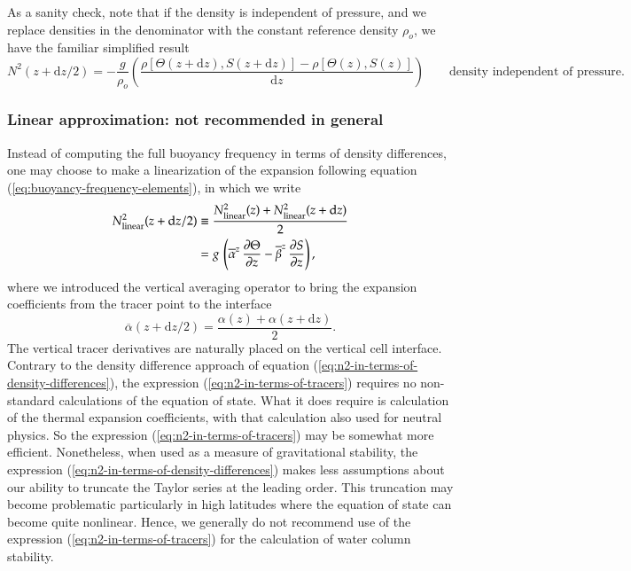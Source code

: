 \normalsize As a sanity check, note that if the density is independent
of pressure, and we replace densities in the denominator with the
constant reference density $\rho_{o}$, we have the familiar simplified
result
\begin{equation}
N^{2}(z+\mathrm{d}z/2) = -\frac{g}{\rho_{o}} 
  \left( 
 \frac{
    \rho[ \Theta(z + \mathrm{d} z), S(z + \mathrm{d} z)]
  -\rho[ \Theta(z), S(z)]
  }{\mathrm{d}z}
 \right)    \qquad   \mbox{density independent of pressure}.
\end{equation}


\subsubsection{Linear approximation: not recommended in general}

Instead of computing the full buoyancy frequency in terms of density
differences, one may choose to make a linearization of the expansion
following equation (\ref{eq:buoyancy-frequency-elements}), in which we
write
\begin{equation}
\begin{split}
N^{2}_{\mbox{\scriptsize linear}} (z+\mathrm{d}z/2) 
&\equiv \frac{N^{2}_{\mbox{\scriptsize linear}} (z) + N^{2}_{\mbox{\scriptsize linear}} (z+\mathrm{d}z)}{2}
\\
&= 
 g \, \left( \overline{\alpha}^{z}  \, \frac{\partial \Theta}{\partial z} 
               -\overline{\beta}^{z} \,  \frac{\partial S}{\partial z} \right),
\end{split}
\label{eq:n2-in-terms-of-tracers}
\end{equation} 
where we introduced the vertical averaging operator to bring the
expansion coefficients from the tracer point to the interface
\begin{equation}
  \overline{\alpha}(z+\mathrm{d}z/2) = \frac{\alpha(z) + \alpha(z+\mathrm{d}z)}{2}.
\end{equation}
The vertical tracer derivatives are naturally placed on the vertical
cell interface.  Contrary to the density difference approach of
equation (\ref{eq:n2-in-terms-of-density-differences}), the expression
(\ref{eq:n2-in-terms-of-tracers}) requires no non-standard
calculations of the equation of state.  What it does require is
calculation of the thermal expansion coefficients, with that
calculation also used for neutral physics.  So the expression
(\ref{eq:n2-in-terms-of-tracers}) may be somewhat more efficient.
Nonetheless, when used as a measure of gravitational stability, the
expression (\ref{eq:n2-in-terms-of-density-differences}) makes less
assumptions about our ability to truncate the Taylor series at the
leading order.  This truncation may become problematic particularly in
high latitudes where the equation of state can become quite nonlinear.
Hence, we generally do not recommend use of the expression
(\ref{eq:n2-in-terms-of-tracers}) for the calculation of water column
stability.


